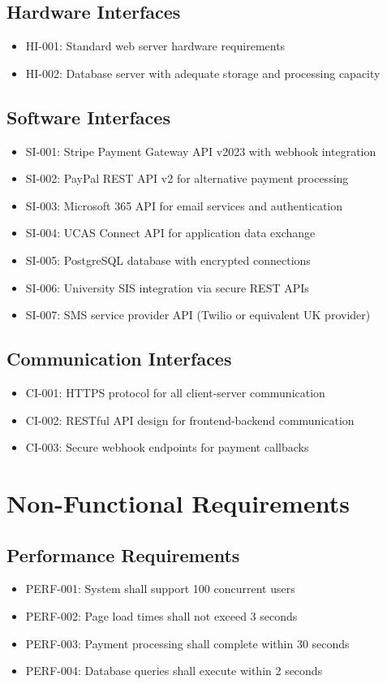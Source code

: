 \documentclass[11pt]{article}
\begin{document}
\subsection{Hardware Interfaces}
\begin{itemize}
    \item HI-001: Standard web server hardware requirements
    \item HI-002: Database server with adequate storage and processing capacity
\end{itemize}

\subsection{Software Interfaces}
\begin{itemize}
    \item SI-001: Stripe Payment Gateway API v2023 with webhook integration
    \item SI-002: PayPal REST API v2 for alternative payment processing
    \item SI-003: Microsoft 365 API for email services and authentication
    \item SI-004: UCAS Connect API for application data exchange
    \item SI-005: PostgreSQL database with encrypted connections
    \item SI-006: University SIS integration via secure REST APIs
    \item SI-007: SMS service provider API (Twilio or equivalent UK provider)
\end{itemize}

\subsection{Communication Interfaces}
\begin{itemize}
    \item CI-001: HTTPS protocol for all client-server communication
    \item CI-002: RESTful API design for frontend-backend communication
    \item CI-003: Secure webhook endpoints for payment callbacks
\end{itemize}

\section{Non-Functional Requirements}

\subsection{Performance Requirements}
\begin{itemize}
    \item PERF-001: System shall support 100 concurrent users
    \item PERF-002: Page load times shall not exceed 3 seconds
    \item PERF-003: Payment processing shall complete within 30 seconds
    \item PERF-004: Database queries shall execute within 2 seconds
\end{itemize}
\end{document}
